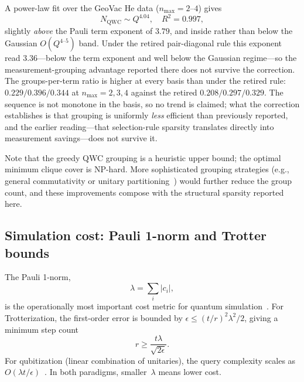 \documentclass[aps,pra,twocolumn,superscriptaddress,longbibliography]{revtex4-2}
\newcommand{\gvq}[2]{#2}
\begin{document}
A power-law fit over the GeoVac He data ($n_{\max} = 2$--$4$) gives
\begin{equation}
  N_{\mathrm{QWC}} \sim Q^{\gvq{exp_qwc_3pt}{4.04}}, \quad R^2 = 0.997,
  \label{eq:qwc_scaling}
\end{equation}
slightly \emph{above} the Pauli term exponent of $\gvq{exp_pauli_4pt}{3.79}$, and inside
rather than below the Gaussian $O(Q^{4\text{--}5})$ band.  Under the
retired pair-diagonal rule this exponent read $3.36$---below the term
exponent and well below the Gaussian regime---so the measurement-grouping
advantage reported there does not survive the correction.  The groups-per-term ratio
is higher at every basis than under the retired rule:\
$0.229 / 0.396 / 0.344$ at $n_{\max}=2,3,4$ against the retired
$0.208 / 0.297 / 0.329$.  The sequence is not monotone in the basis, so no
trend is claimed; what the correction establishes is that grouping is
uniformly \emph{less} efficient than previously reported, and the earlier
reading---that selection-rule sparsity translates directly into measurement
savings---does not survive it.

Note that the greedy QWC grouping is a heuristic upper bound; the
optimal minimum clique cover is NP-hard.  More sophisticated grouping
strategies (e.g., general commutativity or unitary
partitioning~\cite{yen2020}) would further reduce the group count, and
these improvements compose with the structural sparsity reported here.


\subsection{Simulation cost: Pauli 1-norm and Trotter bounds}
\label{sec:onenorm}

The Pauli 1-norm,
\begin{equation}
  \lambda = \sum_i |c_i|,
  \label{eq:onenorm}
\end{equation}
is the operationally most important cost metric for quantum
simulation~\cite{childs2021,campbell2019}.  For Trotterization, the
first-order error is bounded by
$\epsilon \le (t/r)^2 \lambda^2 / 2$, giving a minimum step count
\begin{equation}
  r \ge \frac{t\lambda}{\sqrt{2\epsilon}}.
  \label{eq:trotter_steps}
\end{equation}
For qubitization (linear combination of unitaries), the query complexity
scales as $O(\lambda t / \epsilon)$~\cite{childs2021}.  In both
paradigms, smaller~$\lambda$ means lower cost.
\end{document}
